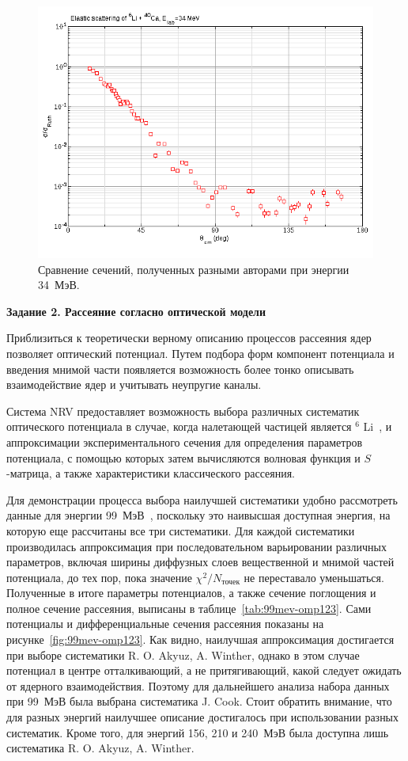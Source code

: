 \documentclass[a4paper, 12pt]{article}
\def\Li{$^6$}
\def\ompI{J. Cook}
\def\ompIII{R. O. Akyuz, A. Winther}
\begin{document}
\begin{figure}
	\includegraphics[width=.49\linewidth]{figures/002-34mev-ratio.png}
	\caption{Сравнение сечений, полученных разными авторами при энергии 34~МэВ.~\cite{26-28-30-34mev,28-34mev}}
	\label{fig:34mev-cmp}
\end{figure}%

\clearpage
\begin{center}
	\textbf{\large Задание 2. Рассеяние согласно оптической модели}
\end{center}

Приблизиться к теоретически верному описанию процессов рассеяния ядер 
позволяет оптический потенциал. Путем подбора форм компонент потенциала 
и введения мнимой части появляется возможность более тонко описывать 
взаимодействие ядер и учитывать неупругие каналы.

Система NRV предоставляет возможность выбора различных систематик 
оптического потенциала в случае, когда налетающей частицей является \Li 
Li~\cite{omp1, omp2, omp3}, и аппроксимации экспериментального сечения 
для определения параметров потенциала, с помощью которых затем 
вычисляются волновая функция и $S$\nobreakdash-матрица, а также 
характеристики классического рассеяния.

Для демонстрации процесса выбора наилучшей систематики удобно 
рассмотреть данные для энергии 99~МэВ~\cite{99mev}, поскольку это 
наивысшая доступная энергия, на которую еще рассчитаны все три 
систематики. Для каждой систематики производилась аппроксимация при 
последовательном варьировании различных параметров, включая ширины 
диффузных слоев вещественной и мнимой частей потенциала, до тех пор, 
пока значение $\chi^2/N_\text{точек}$ не переставало уменьшаться. 
Полученные в итоге параметры потенциалов, а также сечение поглощения 
и полное сечение рассеяния, выписаны в таблице~\ref{tab:99mev-omp123}. 
Сами потенциалы и дифференциальные сечения рассеяния показаны на 
рисунке~\ref{fig:99mev-omp123}. Как видно, наилучшая аппроксимация 
достигается при выборе систематики \ompIII, однако в этом случае 
потенциал в центре отталкивающий, а не притягивающий, какой следует 
ожидать от ядерного взаимодействия. Поэтому для дальнейшего анализа 
набора данных при 99~МэВ была выбрана систематика \ompI. Стоит обратить 
внимание, что для разных энергий наилучшее описание достигалось при 
использовании разных систематик. Кроме того, для энергий 156, 210 
и 240~МэВ была доступна лишь систематика \ompIII.
\end{document}
